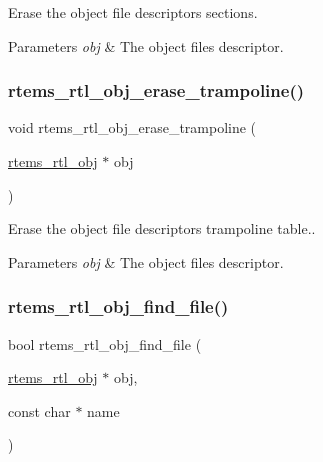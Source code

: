Erase the object file descriptor\textquotesingle{}s sections.


\begin{DoxyParams}{Parameters}
{\em obj} & The object file\textquotesingle{}s descriptor. \\
\hline
\end{DoxyParams}
\mbox{\label{rtl-obj_8c_a59b26b41ab6dacfe609d8c98c36e535a}} 
\subsubsection{\texorpdfstring{rtems\_rtl\_obj\_erase\_trampoline()}{rtems\_rtl\_obj\_erase\_trampoline()}}
{\footnotesize\ttfamily void rtems\+\_\+rtl\+\_\+obj\+\_\+erase\+\_\+trampoline (\begin{DoxyParamCaption}\item[{\mbox{\hyperlink{structrtems__rtl__obj}{rtems\+\_\+rtl\+\_\+obj}} $\ast$}]{obj }\end{DoxyParamCaption})}

Erase the object file descriptor\textquotesingle{}s trampoline table..


\begin{DoxyParams}{Parameters}
{\em obj} & The object file\textquotesingle{}s descriptor. \\
\hline
\end{DoxyParams}
\mbox{\label{rtl-obj_8c_a01178159b33ae5e8a94b77f5f2fd6aa9}} 
\subsubsection{\texorpdfstring{rtems\_rtl\_obj\_find\_file()}{rtems\_rtl\_obj\_find\_file()}}
{\footnotesize\ttfamily bool rtems\+\_\+rtl\+\_\+obj\+\_\+find\+\_\+file (\begin{DoxyParamCaption}\item[{\mbox{\hyperlink{structrtems__rtl__obj}{rtems\+\_\+rtl\+\_\+obj}} $\ast$}]{obj,  }\item[{const char $\ast$}]{name }\end{DoxyParamCaption})}

